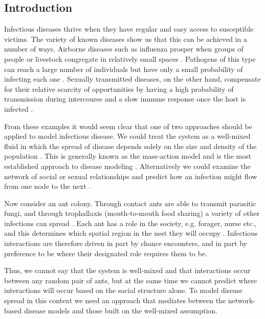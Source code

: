 \documentclass[10pt]{article}
\begin{document}
\begin{multicols}{2}
\section{Introduction}
\noindent
Infectious diseases thrive when they have regular and easy access to susceptible victims. The variety of known diseases show us that this can be achieved in a number of ways. Airborne diseases such as influenza prosper when groups of people or livestock congregate in relatively small spaces \cite{doi:10.1093/oxfordjournals.aje.a112781,koopmans2004transmission}. Pathogens of this type can reach a large number of individuals but have only a small probability of infecting each one \cite{doi:10.1093/infdis/jis773}. Sexually transmitted diseases, on the other hand, compensate for their relative scarcity of opportunities by having a high probability of transmission during intercourse and a slow immune response once the host is infected \cite{anderson1990significance}. 

From these examples it would seem clear that one of two approaches should be applied to model infectious disease. We could treat the system as a well-mixed fluid in which the spread of disease depends solely on the size and density of the population \cite{de1995does,anderson1992infectious}. This is generally known as the mass-action model and is the most established approach to disease modeling \cite{begon2002clarification}. Alternatively we could examine the network of social or sexual relationships and predict how an infection might flow from one node to the next \cite{rothenberg1998using}.

Now consider an ant colony. Through contact ants are able to transmit parasitic fungi, and through trophallaxis (mouth-to-mouth food sharing) a variety of other infections can spread \cite{greenwald2015ant,10.7554/eLife.20375}. Each ant has a role in the society, e.g. forager, nurse etc., and this determines which spatial region in the nest they will occupy \cite{gadau2009organization,Mersch1090}. Infectious interactions are therefore driven in part by chance encounters, and in part by preference to be where their designated role requires them to be. 

Thus, we cannot say that the system is well-mixed and that interactions occur between any random pair of ants, but at the same time we cannot predict where interactions will occur based on the social structure alone. To model disease spread in this context we need an approach that mediates between the network-based disease models and those built on the well-mixed assumption. 


\end{multicols}
\end{document}
